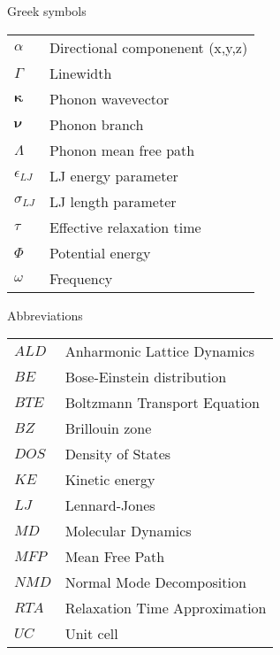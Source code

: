 Greek symbols\\
\begin{longtable}{ l l }
$\alpha$ & Directional componenent (x,y,z)\\
$\Gamma$ & Linewidth\\
$\pmb{\kappa}$ & Phonon wavevector\\ 
$\pmb{\nu}$ & Phonon branch\\
$\Lambda$ & Phonon mean free path\\
$\epsilon_{LJ}$ & LJ energy parameter\\
$\sigma_{LJ}$ & LJ length parameter\\
$\tau$ & Effective relaxation time\\ 
$\Phi$ & Potential energy\\
$\omega$ & Frequency\\
\end{longtable}
\newpage
Abbreviations\\
\begin{longtable}{ l l }
$ALD$ & Anharmonic Lattice Dynamics \\
$BE$ & Bose-Einstein distribution \\
$BTE$ & Boltzmann Transport Equation \\
$BZ$ & Brillouin zone \\
$DOS$ & Density of States \\
$KE$ & Kinetic energy\\
$LJ$ & Lennard-Jones\\
$MD$ & Molecular Dynamics\\
$MFP$ & Mean Free Path\\
$NMD$ & Normal Mode Decomposition\\
$RTA$ & Relaxation Time Approximation\\
$UC$ & Unit cell\\
\end{longtable}
